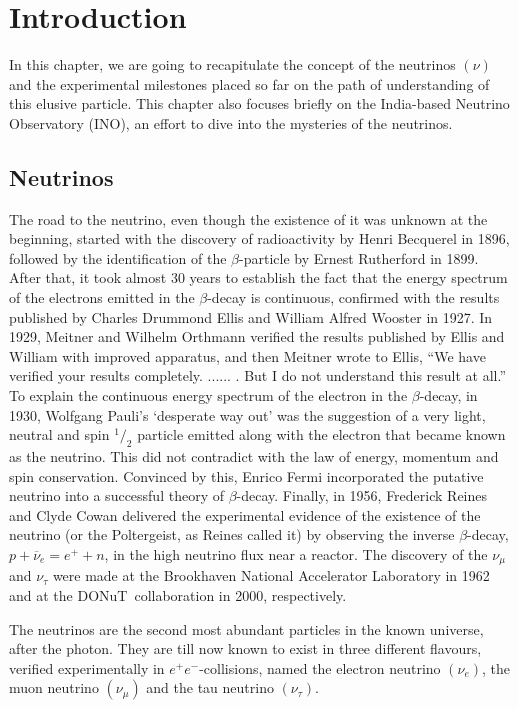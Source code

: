 
\chapter{Introduction}
In this chapter, we are going to recapitulate the concept of the
neutrinos $\left(\nu\right)$ and the experimental milestones placed
so far on the path of understanding of this elusive particle. This
chapter also focuses briefly on the India-based Neutrino Observatory
(INO), an effort to dive into the mysteries of the neutrinos.

\section{Neutrinos}
The road to the neutrino\cite{roadtoneut}, even though the existence
of it was unknown at the beginning, started with the discovery of
radioactivity by Henri Becquerel in 1896\cite{becquerel1896}, followed
by the identification of the $\beta$-particle by Ernest Rutherford in
1899\cite{rutherford1899}. After that, it took almost 30 years to
establish the fact that the energy spectrum of the electrons emitted
in the $\beta$-decay is continuous, confirmed with the results
published by Charles Drummond Ellis and William Alfred Wooster
in 1927\cite{ellis1927}. In 1929, Meitner and Wilhelm Orthmann
verified the results published by Ellis and William with improved
apparatus\cite{meitner1930}, and then Meitner wrote to Ellis,
``We have verified your results completely. ...... . But I do not understand this result at all.''\cite{lettertoCD}
To explain the continuous energy spectrum of the electron in the
$\beta$-decay, in 1930, Wolfgang Pauli's `desperate way out' was the
suggestion of a very light, neutral and spin $^1/_2$ particle emitted
along with the electron that became known as the neutrino. This did
not contradict with the law of energy, momentum and spin conservation.
Convinced by this, Enrico Fermi incorporated the putative neutrino
into a successful theory of $\beta$-decay. Finally, in 1956, Frederick
Reines and Clyde Cowan delivered the experimental evidence of the
existence of the neutrino (or the Poltergeist, as Reines called it)
by observing the inverse $\beta$-decay, $p+\overline{\nu}_e=e^++n$,
in the high neutrino flux near a reactor\cite{reines1956}.
The discovery of the $\nu_{\mu}$ and $\nu_{\tau}$ were made at
the Brookhaven National Accelerator Laboratory in
1962\cite{muonneut1962} and at the DONuT~collaboration in
2000\cite{tauneut2001}, respectively.

The neutrinos are the second most abundant particles in the known
universe, after the photon. They are till now known to exist
in three different flavours, verified experimentally in
\mbox{$e^+e^-$-collisions\cite{numberneut}}, named the electron
neutrino $\left(\nu_e\right)$, the muon neutrino
$\left(\nu_{\mu}\right)$ and the tau neutrino $\left(\nu_{\tau}\right)$.

